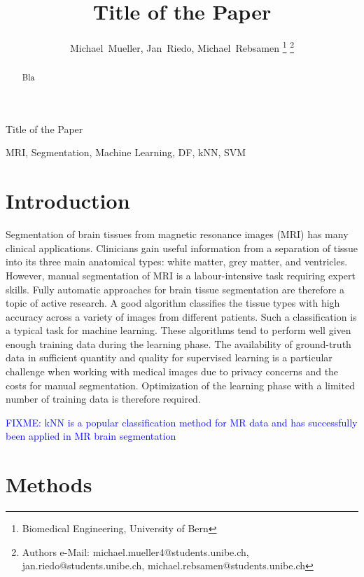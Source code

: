 \documentclass[journal]{IEEEtran}
\newcommand\FIXME[1]{\textcolor{blue}{FIXME: #1}}
\begin{document}
\title{Title of the Paper}


\author{Michael~Mueller,
        Jan~Riedo,
        Michael~Rebsamen%
\thanks{Biomedical Engineering, University of Bern}%
\thanks{Authors e-Mail: michael.mueller4@students.unibe.ch, jan.riedo@students.unibe.ch, michael.rebsamen@students.unibe.ch}}%
%
{Title of the Paper}
\maketitle

\begin{abstract}
Bla
\end{abstract}
\begin{IEEEkeywords}
MRI, Segmentation, Machine Learning, DF, kNN, SVM
\end{IEEEkeywords}


\section{Introduction}
Segmentation of brain tissues from magnetic resonance images (MRI) has many clinical applications. Clinicians gain useful information from a separation of tissue into its three main anatomical types: white matter, grey matter, and ventricles. However, manual segmentation of MRI is a labour-intensive task requiring expert skills. Fully automatic approaches for brain tissue segmentation are therefore a topic of active research. A good algorithm classifies the tissue types with high accuracy across a variety of images from different patients. Such a classification is a typical task for machine learning. These algorithms tend to perform well given enough training data during the learning phase. The availability of ground-truth data in sufficient quantity and quality for supervised learning is a particular challenge when working with medical images due to privacy concerns and the costs for manual segmentation. Optimization of the learning phase with a limited number of training data is therefore required.

\FIXME{kNN is a popular classification method for MR data and has successfully been applied in MR brain segmentation\cite{Anbeek2004,Cocosco2003,Warfield2000}}


\section{Methods}
\end{document}
